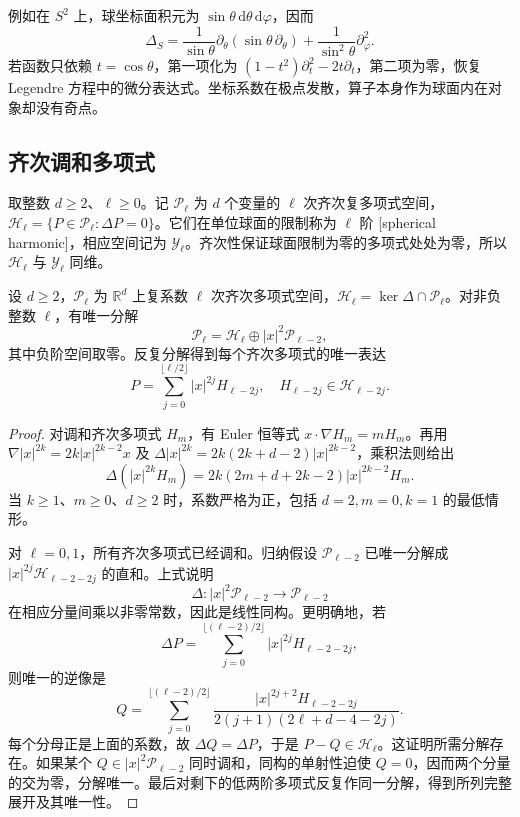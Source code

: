 例如在 \(S^2\) 上，球坐标面积元为 \(\sin\theta\,\mathrm d\theta\,\mathrm d\varphi\)，因而
\[\Delta_S=\frac1{\sin\theta}\partial_\theta(\sin\theta\,\partial_\theta)
              +\frac1{\sin^2\theta}\partial_\varphi^2.
\]
若函数只依赖 \(t=\cos\theta\)，第一项化为 \((1-t^2)\partial_t^2-2t\partial_t\)，第二项为零，恢复 Legendre 方程中的微分表达式。坐标系数在极点发散，算子本身作为球面内在对象却没有奇点。

\subsection{齐次调和多项式}
\label{b2:subsec:B20302}

取整数 \(d\ge2\)、\(\ell\ge0\)。记 \(\mathcal P_\ell\) 为 \(d\) 个变量的 \(\ell\) 次齐次复多项式空间，\(\mathcal H_\ell=\{P\in\mathcal P_\ell:\Delta P=0\}\)。它们在单位球面的限制称为 \(\ell\) 阶 [spherical harmonic]，相应空间记为 \(\mathcal Y_\ell\)。齐次性保证球面限制为零的多项式处处为零，所以 \(\mathcal H_\ell\) 与 \(\mathcal Y_\ell\) 同维。

\begin{proposition}[齐次多项式的调和分解]
\label{b2:prop:B2-harmonic-decomposition}
设 \(d\geq2\)，\(\mathcal P_\ell\) 为 \(\mathbb R^d\) 上复系数 \(\ell\) 次齐次多项式空间，\(\mathcal H_\ell=\ker\Delta\cap\mathcal P_\ell\)。对非负整数 \(\ell\)，有唯一分解
\[\mathcal P_\ell=\mathcal H_\ell\oplus|x|^2\mathcal P_{\ell-2},\]
其中负阶空间取零。反复分解得到每个齐次多项式的唯一表达
\[P=\sum_{j=0}^{\lfloor\ell/2\rfloor}|x|^{2j}H_{\ell-2j},\quad
 H_{\ell-2j}\in\mathcal H_{\ell-2j}.
\]
\end{proposition}
\begin{proof}
对调和齐次多项式 \(H_m\)，有 Euler 恒等式
\(x\cdot\nabla H_m=mH_m\)。再用
\(\nabla |x|^{2k}=2k|x|^{2k-2}x\) 及
\(\Delta|x|^{2k}=2k(2k+d-2)|x|^{2k-2}\)，乘积法则给出
\[
 \Delta(|x|^{2k}H_m)
       =2k(2m+d+2k-2)|x|^{2k-2}H_m.
\]
当 \(k\geq1\)、\(m\geq0\)、\(d\geq2\) 时，系数严格为正，包括 \(d=2,m=0,k=1\) 的最低情形。

对 \(\ell=0,1\)，所有齐次多项式已经调和。归纳假设
\(\mathcal P_{\ell-2}\) 已唯一分解成
\(|x|^{2j}\mathcal H_{\ell-2-2j}\) 的直和。上式说明
\[
 \Delta:|x|^2\mathcal P_{\ell-2}\longrightarrow\mathcal P_{\ell-2}
\]
在相应分量间乘以非零常数，因此是线性同构。更明确地，若
\[
 \Delta P
 =\sum_{j=0}^{\lfloor(\ell-2)/2\rfloor}
       |x|^{2j}H_{\ell-2-2j},
\]
则唯一的逆像是
\[
 Q=\sum_{j=0}^{\lfloor(\ell-2)/2\rfloor}
       \frac{|x|^{2j+2}H_{\ell-2-2j}}
            {2(j+1)(2\ell+d-4-2j)}.
\]
每个分母正是上面的系数，故 \(\Delta Q=\Delta P\)，于是
\(P-Q\in\mathcal H_\ell\)。这证明所需分解存在。如果某个
\(Q\in|x|^2\mathcal P_{\ell-2}\) 同时调和，同构的单射性迫使 \(Q=0\)，因而两个分量的交为零，分解唯一。最后对剩下的低两阶多项式反复作同一分解，得到所列完整展开及其唯一性。
\end{proof}

